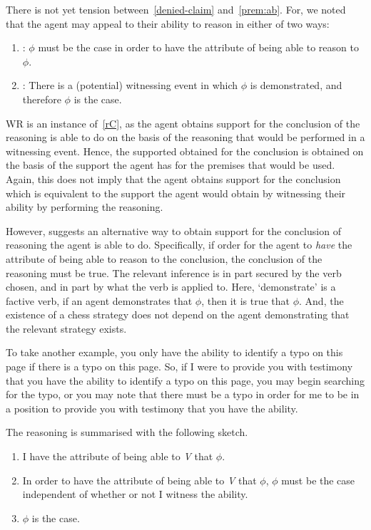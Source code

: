 \documentclass[10pt]{article}
\begin{document}
\begin{note}[Attribute]
  There is not yet tension between~\ref{denied-claim} and~\ref{prem:ab}.
  For, we noted that the agent may appeal to their ability to reason in either of two ways:
  \begin{enumerate}[label=\(\cdot\)]
  \item \AR{}: \(\phi\) must be the case in order to have the attribute of being able to reason to \(\phi\).
  \item \WR{}: There is a (potential) witnessing event in which \(\phi\) is demonstrated, and therefore \(\phi\) is the case.
  \end{enumerate}
  WR{} is an instance of~\ref{rC}, as the agent obtains support for the conclusion of the reasoning is able to do on the basis of the reasoning that would be performed in a witnessing event.
  Hence, the supported obtained for the conclusion is obtained on the basis of the support the agent has for the premises that would be used.
  Again, this does not imply that the agent obtains support for the conclusion which is equivalent to the support the agent would obtain by witnessing their ability by performing the reasoning.

  However, \AR{} suggests an alternative way to obtain support for the conclusion of reasoning the agent is able to do.
  Specifically, if order for the agent to \emph{have} the attribute of being able to reason to the conclusion, the conclusion of the reasoning must be true.
  The relevant inference is in part secured by the verb chosen, and in part by what the verb is applied to.
  Here, `demonstrate' is a factive verb, if an agent demonstrates that \(\phi\), then it is true that \(\phi\).
  And, the existence of a chess strategy does not depend on the agent demonstrating that the relevant strategy exists.

  To take another example, you only have the ability to identify a typo on this page if there is a typo on this page.
  So, if I were to provide you with testimony that you have the ability to identify a typo on this page, you may begin searching for the typo, or you may note that there must be a typo in order for me to be in a position to provide you with testimony that you have the ability.

  The reasoning is summarised with the following sketch.

  \begin{enumerate}[label=(\textsf{A}\arabic*), ref=(\textsf{A}\arabic*)]
  \item\label{WR:Sketch:1} I have the attribute of being able to \emph{V} that \(\phi\).
  \item\label{WR:Sketch:2} In order to have the attribute of being able to \emph{V} that \(\phi\), \(\phi\) must be the case independent of whether or not I witness the ability.
  \item\label{WR:Sketch:3} \(\phi\) is the case.
  \end{enumerate}


\end{note}
\end{document}
